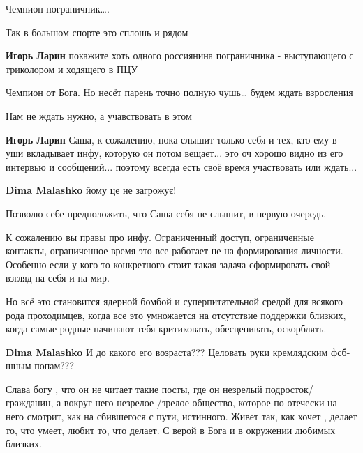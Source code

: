 \begin{itemize}
Чемпион пограничник….

\begin{itemize} %
Так в большом спорте это сплошь и рядом

\textbf{Игорь Ларин} покажите хоть одного россиянина пограничника - выступающего с триколором и ходящего в ПЦУ
\end{itemize} %

Чемпион от Бога. Но несёт парень точно полную чушь… будем ждать взросления

\begin{itemize} %
Нам не ждать нужно, а учавствовать в этом

\textbf{Игорь Ларин} Саша, к сожалению, пока слышит только себя и тех, кто ему в уши вкладывает инфу, которую он потом вещает... это оч хорошо видно из его интервью и сообщений... поэтому всегда есть своё время участвовать или ждать...

\textbf{Dima Malashko} йому це не загрожує!


Позволю себе предположить, что Саша себя не слышит, в первую очередь.

К сожалению вы правы про инфу. Ограниченный доступ, ограниченные контакты,
ограниченное время это все работает не на формирования личности. Особенно если
у кого то конкретного стоит такая задача-сформировать свой взгляд на себя и на
мир.

Но всё это становится ядерной бомбой и суперпитательной средой для всякого рода
проходимцев, когда все это умножается на отсутствие поддержки близких, когда
самые родные начинают тебя критиковать, обесценивать, оскорблять.


\textbf{Dima Malashko} И до какого его возраста??? Целовать руки кремлядским фсб-шным попам???
\end{itemize} %


Слава богу , что он не читает такие посты, где он незрелый подросток/
гражданин, а вокруг него незрелое /зрелое общество, которое по-отечески на него
смотрит, как на сбившегося с пути, истинного. Живет так, как хочет , делает то,
что умеет, любит то, что делает. С верой в Бога и в окружении любимых близких.


\end{itemize}
